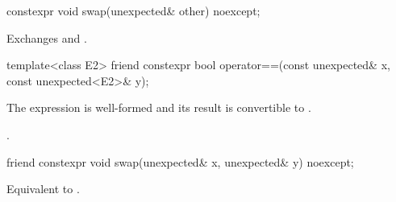 %
\begin{itemdecl}
constexpr void swap(unexpected& other) noexcept;
\end{itemdecl}

\begin{itemdescr}
\pnum
\effects
Exchanges  and .
\end{itemdescr}

%
\begin{itemdecl}
template<class E2>
friend constexpr bool operator==(const unexpected& x, const unexpected<E2>& y);
\end{itemdecl}

\begin{itemdescr}
\pnum
\mandates
The expression  is well-formed and its result is convertible to .

\pnum
\returns
{}.
\end{itemdescr}

%
\begin{itemdecl}
friend constexpr void swap(unexpected& x, unexpected& y) noexcept;
\end{itemdecl}

\begin{itemdescr}
\pnum
\effects
Equivalent to .
\end{itemdescr}
